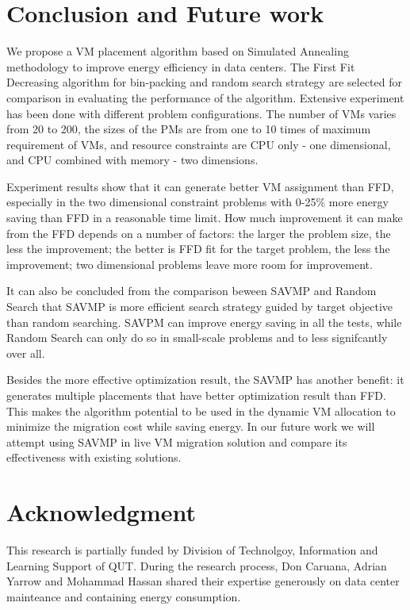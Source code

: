 \documentclass[10pt, conference, compsocconf]{IEEEtran}
\begin{document}
\section{Conclusion and Future work}

We propose a VM placement algorithm based on Simulated Annealing methodology to
improve energy efficiency in data centers. The First Fit Decreasing algorithm
for bin-packing and random search strategy are selected for comparison in
evaluating the performance of the algorithm. Extensive experiment has been done
with different problem configurations. The number of VMs varies from 20 to 200,
the sizes of the PMs are from one to 10 times of maximum requirement of VMs, and
resource constraints are CPU only - one dimensional, and CPU combined with
memory - two dimensions.

Experiment results show that it can generate better VM assignment than FFD,
especially in the two dimensional constraint problems with 0-25\% more energy
saving than FFD in a reasonable time limit. How much improvement it can make
from the FFD depends on a number of factors: the larger the problem size, the
less the improvement; the better is FFD fit for the target problem, the less the
improvement; two dimensional problems leave more room for improvement.

It can also be concluded from the comparison beween SAVMP and Random
Search that SAVMP is more efficient search strategy guided by target objective
than random searching. SAVPM can improve energy saving in all the tests, while
Random Search can only do so in small-scale problems and to less signifcantly
over all.

Besides the more effective optimization result, the SAVMP has another benefit:
it generates multiple placements that have better optimization result than FFD.
This makes the algorithm potential to be used in the dynamic VM allocation to
minimize the migration cost while saving energy. In our future work we will
attempt using SAVMP in live VM migration solution and compare its effectiveness
with existing solutions.

\section*{Acknowledgment}
This research is partially funded by Division of Technolgoy, Information and
Learning Support of QUT.
During the research process, Don Caruana, Adrian Yarrow and Mohammad Hassan
shared their expertise generously on data center mainteance and containing
energy consumption.




\end{document}
